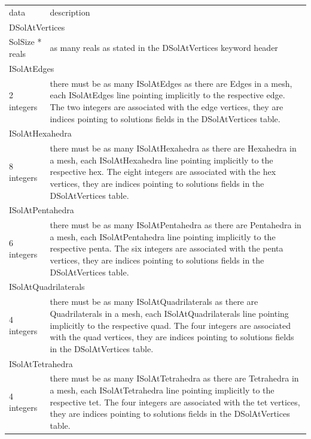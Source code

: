 \documentclass[a4paper,12pt]{article}
\begin{document}
\setlongtables
\begin{longtable}{|m{4cm}|m{11cm}|}
\endhead
\endfoot

\hline
\multicolumn{2}{|l|}{keyword} \\
\hline
data & description \\
\hline\hline

\multicolumn{2}{|l|}{DSolAtVertices} \\
\hline
SolSize * reals & as many reals as stated in the DSolAtVertices keyword header \\
\hline\hline

\multicolumn{2}{|l|}{ISolAtEdges} \\
\hline
2 integers & there must be as many ISolAtEdges as there are Edges in a mesh, each ISolAtEdges line pointing implicitly to the respective edge. The two integers are associated with the edge vertices, they are indices pointing to solutions fields in the DSolAtVertices table. \\
\hline\hline

\multicolumn{2}{|l|}{ISolAtHexahedra} \\
\hline
8 integers & there must be as many ISolAtHexahedra as there are Hexahedra in a mesh, each ISolAtHexahedra line pointing implicitly to the respective hex. The eight integers are associated with the hex vertices, they are indices pointing to solutions fields in the DSolAtVertices table. \\
\hline\hline

\multicolumn{2}{|l|}{ISolAtPentahedra} \\
\hline
6 integers & there must be as many ISolAtPentahedra as there are Pentahedra in a mesh, each ISolAtPentahedra line pointing implicitly to the respective penta. The six integers are associated with the penta vertices, they are indices pointing to solutions fields in the DSolAtVertices table. \\
\hline\hline

\multicolumn{2}{|l|}{ISolAtQuadrilaterals} \\
\hline
4 integers & there must be as many ISolAtQuadrilaterals as there are Quadrilaterals in a mesh, each ISolAtQuadrilaterals line pointing implicitly to the respective quad. The four integers are associated with the quad vertices, they are indices pointing to solutions fields in the DSolAtVertices table. \\
\hline\hline

\multicolumn{2}{|l|}{ISolAtTetrahedra} \\
\hline
4 integers & there must be as many ISolAtTetrahedra as there are Tetrahedra in a mesh, each ISolAtTetrahedra line pointing implicitly to the respective tet. The four integers are associated with the tet vertices, they are indices pointing to solutions fields in the DSolAtVertices table. \\
\hline\hline


\end{longtable}
\end{document}
